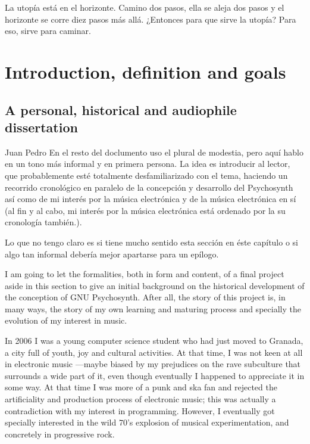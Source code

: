
\begin{savequote}[10pc]
  \sffamily La utopía está en el horizonte. Camino dos pasos, ella se
  aleja dos pasos y el horizonte se corre diez pasos más
  allá. ¿Entonces para que sirve la utopía? Para eso, sirve para
  caminar.
\end{savequote}

\chapter{Introduction, definition and goals}

\section{A personal, historical and audiophile dissertation}

\begin{todo}{Juan Pedro}
  En el resto del doclumento uso el plural de modestia, pero aquí
  hablo en un tono más informal y en primera persona. La idea es
  introducir al lector, que probablemente esté totalmente
  desfamiliarizado con el tema, haciendo un recorrido cronológico en
  paralelo de la concepción y desarrollo del Psychosynth así como de
  mi interés por la música electrónica y de la música electrónica en
  sí (al fin y al cabo, mi interés por la música electrónica está
  ordenado por la su cronología también.). 

  Lo que no tengo claro es si tiene mucho sentido esta sección en éste
  capítulo o si algo tan informal debería mejor apartarse para un
  epílogo.
\end{todo}

I am going to let the formalities, both in form and content, of a
final project aside in this section to give an initial background on
the historical development of the conception of GNU Psychosynth. After
all, the story of this project is, in many ways, the story of my own
learning and maturing process and specially the evolution of my
interest in music.

In 2006 I was a young computer science student who had just moved to
Granada, a city full of youth, joy and cultural activities. At that
time, I was not keen at all in electronic music ---maybe biased by my
prejudices on the rave subculture that surrounds a wide part of it,
even though eventually I happened to appreciate it in some way. At
that time I was more of a punk and ska fan and rejected the
artificiality and production process of electronic music; this was
actually a contradiction with my interest in programming. However, I
eventually got specially interested in the wild 70's explosion of
musical experimentation, and concretely in progressive rock.

